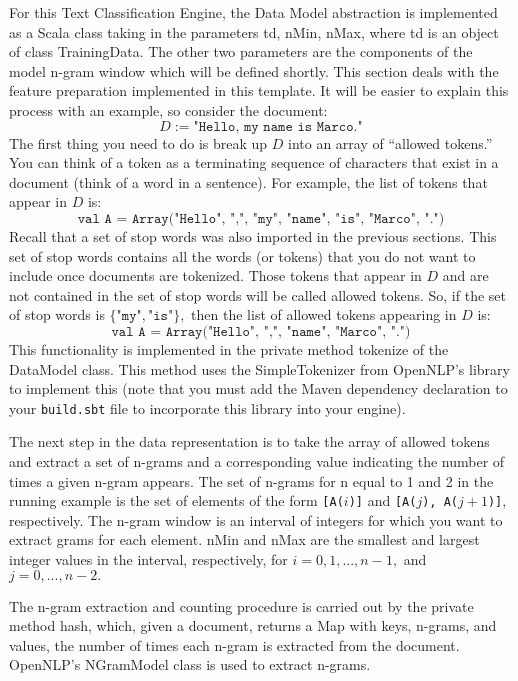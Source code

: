 \documentclass[a4paper,12pt]{article}
\renewcommand{\tt}[1]{\texttt{#1}}
\newcommand{\3}{\left}
\newcommand{\4}{\right}
\renewcommand{\-}[1]{{}^{-#1}}
\begin{document}
For this Text Classification Engine, the Data Model abstraction is implemented as a Scala class taking in the parameters td, nMin, nMax, where td is an object of class TrainingData. The other two parameters are the components of the model n-gram window which will be defined shortly. This section deals with the feature preparation implemented in this template. It will be easier to explain this process with an example, so consider the document:
$$
D := \tt{"Hello, my name is Marco."}
$$
The first thing you need to do is break up $D$ into an array of \enquote{allowed tokens.} You can think of a token as a terminating sequence of characters that exist in a document (think of a word in a sentence). For example, the list of tokens that appear in $D$ is:
$$
\tt{val A = Array("Hello", ",", "my",  "name", "is", "Marco", ".")}
$$
Recall that a set of stop words was also imported in the previous sections. This set of stop words contains all the words (or tokens) that you do not want to include once documents are tokenized. Those tokens that appear in $D$ and are not contained in the set of stop words will be called allowed tokens. So, if the set of stop words is $\{\tt{"my"}, \tt{"is"}\},$ then the list of allowed tokens appearing in $D$ is:
$$
\tt{val A = Array("Hello", ",",  "name", "Marco", ".")}
$$
This functionality is implemented in the private method tokenize of the DataModel class. This method uses the SimpleTokenizer from OpenNLP's library to implement this (note that you must add the Maven dependency declaration to your \tt{build.sbt} file to incorporate this library into your engine).

 The next step in the data representation is to take the array of allowed tokens and extract a set of n-grams and a corresponding value indicating the number of times a given n-gram appears. The set of n-grams for n equal to 1 and 2 in the running example is the set of elements of the form \tt{[A($i$)]} and \tt{[A($j$), A($j + 1$)]}, respectively. The n-gram window is an interval of integers for which you want to extract grams for each element. nMin and nMax are the smallest and largest integer values in the interval, respectively, for $i = 0, 1, ..., n - 1,$ and $j = 0, ..., n - 2.$ 

The n-gram extraction and counting procedure is carried out by the private method hash, which, given a document, returns a Map with keys, n-grams, and values, the number of times each n-gram is extracted from the document. OpenNLP's NGramModel class is used to extract n-grams.
\end{document}
